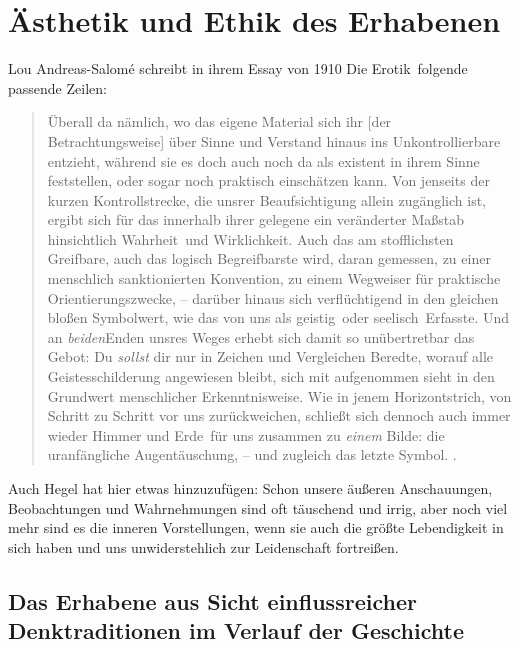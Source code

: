 \chapter{\"{A}sthetik und Ethik des Erhabenen}\label{ch:ethikUndAestehtik}

Lou Andreas-Salom\'e schreibt in ihrem Essay von 1910 \glqq Die Erotik\grqq\
  folgende passende Zeilen:
\begin{quote}
  Überall da nämlich, wo das eigene Material sich ihr [der Betrachtungsweise]
    über Sinne und Verstand hinaus ins Unkontrollierbare entzieht, während sie
    es doch auch noch da als existent in ihrem Sinne feststellen, oder sogar
    noch praktisch einschätzen kann.
  Von jenseits der kurzen Kontrollstrecke, die unsrer Beaufsichtigung allein
    zugänglich ist, ergibt sich für das innerhalb ihrer gelegene ein
    veränderter Maßstab hinsichtlich \frqq Wahrheit\flqq\ und \frqq
    Wirklichkeit\flqq.
  Auch das am stofflichsten Greifbare, auch das logisch
    Begreifbarste wird, daran gemessen, zu einer menschlich
    sanktionierten Konvention, zu einem Wegweiser für praktische
    Orientierungszwecke, -- darüber hinaus sich verflüchtigend in den gleichen
    bloßen Symbolwert, wie das von uns als \frqq geistig\flqq\ oder \frqq
    seelisch\flqq\ Erfasste.
  Und an \emph{beiden}Enden unsres Weges erhebt sich damit so unübertretbar
    das Gebot: \frqq Du \emph{sollst} dir nur in Zeichen und Vergleichen
    Beredte, worauf alle Geistesschilderung angewiesen bleibt, sich mit
    aufgenommen sieht in den Grundwert menschlicher Erkenntnisweise. Wie in
    jenem Horizontstrich, von Schritt zu Schritt vor uns zurückweichen,
    schließt sich dennoch auch immer wieder \flqq Himmer und Erde\flqq\ für
    uns zusammen zu \emph{einem} Bilde: die uranfängliche Augentäuschung, --
    und zugleich das letzte Symbol.
  \citep{Salome1910}.
\end{quote}
Auch Hegel hat hier etwas hinzuzufügen: \glqq Schon unsere äußeren
  Anschauungen, Beobachtungen und Wahrnehmungen sind oft täuschend und irrig,
  aber noch viel mehr sind es die inneren Vorstellungen, wenn sie auch die
  größte Lebendigkeit in sich haben und uns unwiderstehlich zur Leidenschaft
  fortreißen.\grqq\ \citep[S. 41]{Hegel1986}

\newpage
\section{Das Erhabene aus Sicht einflussreicher Denktraditionen im Verlauf der
Geschichte}

